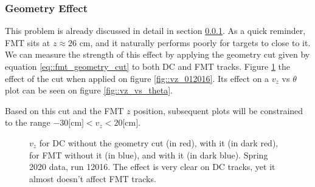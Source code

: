 \subsubsection{Geometry Effect}
\label{sssec::geometry_effect}
    This problem is already discussed in detail in section \ref{sssec::geometry_effect}.
    As a quick reminder, FMT sits at $z \approx 26$ cm, and it naturally performs poorly for targets to close to it.
    We can measure the strength of this effect by applying the geometry cut given by equation \eqref{eq::fmt_geometry_cut} to both DC and FMT tracks.
    Figure \ref{fig::vz_012016_geomcut} the effect of the cut when applied on figure \ref{fig::vz_012016}.
    Its effect on a $v_z$ vs $\theta$ plot can be seen on figure \ref{fig::vz_vs_theta}.

    Based on this cut and the FMT $z$ position, subsequent plots will be constrained to the range $-30 \text{[cm]} < v_z < 20 \text{[cm]}$.

    \begin{figure}[h!]
        \centering{}
        \caption[$v_z$ for DC and FMT, w/ and w/out the geometry cut, run 12016]{$v_z$ for DC without the geometry cut (in red), with it (in dark red), for FMT without it (in blue), and with it (in dark blue). Spring 2020 data, run 12016. The effect is very clear on DC tracks, yet it almost doesn't affect FMT tracks.}
        \label{fig::vz_012016_geomcut}
    \end{figure}
